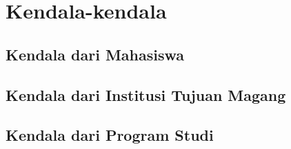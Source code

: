 \section{Kendala-kendala}

\subsection{Kendala dari Mahasiswa}

\subsection{Kendala dari Institusi Tujuan Magang}

\subsection{Kendala dari Program Studi}
